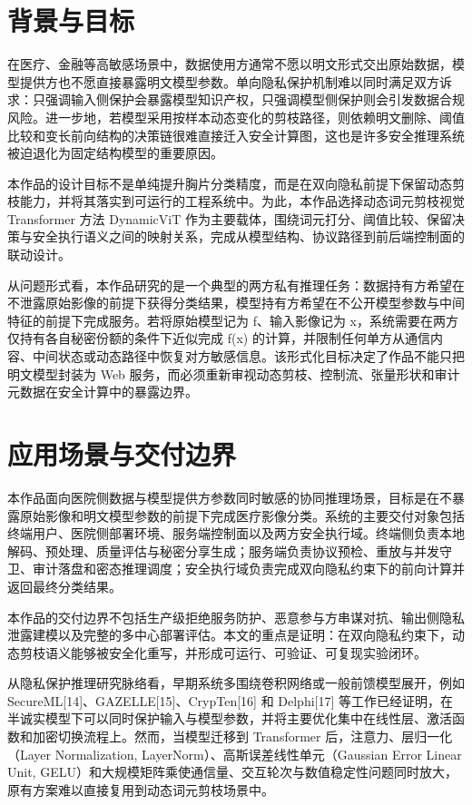 \section{背景与目标}

在医疗、金融等高敏感场景中，数据使用方通常不愿以明文形式交出原始数据，模型提供方也不愿直接暴露明文模型参数。单向隐私保护机制难以同时满足双方诉求：只强调输入侧保护会暴露模型知识产权，只强调模型侧保护则会引发数据合规风险。进一步地，若模型采用按样本动态变化的剪枝路径，则依赖明文删除、阈值比较和变长前向结构的决策链很难直接迁入安全计算图，这也是许多安全推理系统被迫退化为固定结构模型的重要原因。

本作品的设计目标不是单纯提升胸片分类精度，而是在双向隐私前提下保留动态剪枝能力，并将其落实到可运行的工程系统中。为此，本作品选择动态词元剪枝视觉 Transformer 方法 DynamicViT 作为主要载体，围绕词元打分、阈值比较、保留决策与安全执行语义之间的映射关系，完成从模型结构、协议路径到前后端控制面的联动设计。

从问题形式看，本作品研究的是一个典型的两方私有推理任务：数据持有方希望在不泄露原始影像的前提下获得分类结果，模型持有方希望在不公开模型参数与中间特征的前提下完成服务。若将原始模型记为 f、输入影像记为 x，系统需要在两方仅持有各自秘密份额的条件下近似完成 f(x) 的计算，并限制任何单方从通信内容、中间状态或动态路径中恢复对方敏感信息。该形式化目标决定了作品不能只把明文模型封装为 Web 服务，而必须重新审视动态剪枝、控制流、张量形状和审计元数据在安全计算中的暴露边界。

\section{应用场景与交付边界}

本作品面向医院侧数据与模型提供方参数同时敏感的协同推理场景，目标是在不暴露原始影像和明文模型参数的前提下完成医疗影像分类。系统的主要交付对象包括终端用户、医院侧部署环境、服务端控制面以及两方安全执行域。终端侧负责本地解码、预处理、质量评估与秘密分享生成；服务端负责协议预检、重放与并发守卫、审计落盘和密态推理调度；安全执行域负责完成双向隐私约束下的前向计算并返回最终分类结果。

本作品的交付边界不包括生产级拒绝服务防护、恶意参与方串谋对抗、输出侧隐私泄露建模以及完整的多中心部署评估。本文的重点是证明：在双向隐私约束下，动态剪枝语义能够被安全化重写，并形成可运行、可验证、可复现实验闭环。

从隐私保护推理研究脉络看，早期系统多围绕卷积网络或一般前馈模型展开，例如 SecureML[14]、GAZELLE[15]、CrypTen[16] 和 Delphi[17] 等工作已经证明，在半诚实模型下可以同时保护输入与模型参数，并将主要优化集中在线性层、激活函数和加密切换流程上。然而，当模型迁移到 Transformer 后，注意力、层归一化（Layer Normalization, LayerNorm）、高斯误差线性单元（Gaussian Error Linear Unit, GELU）和大规模矩阵乘使通信量、交互轮次与数值稳定性问题同时放大，原有方案难以直接复用到动态词元剪枝场景中。

